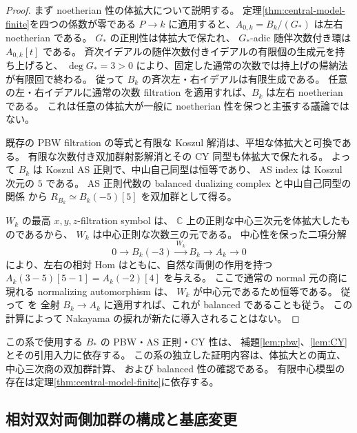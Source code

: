 \begin{proof}
まず noetherian 性の体拡大について説明する。
定理\ref{thm:central-model-finite}を四つの係数が零である
$P\to k$ に適用すると、$A_{0,k}=B_k/(G_*)$ は左右 noetherian である。
$G_*$ の正則性は体拡大で保たれ、
$G_*$-adic 随伴次数付き環は $A_{0,k}[t]$ である。
斉次イデアルの随伴次数付きイデアルの有限個の生成元を持ち上げると、
$\deg G_*=3>0$ により、固定した通常の次数では持上げの帰納法が有限回で終わる。
従って $B_k$ の斉次左・右イデアルは有限生成である。
任意の左・右イデアルに通常の次数 filtration を適用すれば、$B_k$ は左右 noetherian である。
これは任意の体拡大が一般に noetherian 性を保つと主張する議論ではない。

既存の PBW filtration の等式と有限な Koszul 解消は、平坦な体拡大と可換である。
有限な次数付き双加群射影解消とその CY 同型も体拡大で保たれる。
よって $B_k$ は Koszul AS 正則で、中山自己同型は恒等であり、
AS index は Koszul 次元の $5$ である。
AS 正則代数の balanced dualizing complex と中山自己同型の関係
\cite[Lemma~3.5 の証明、Theorem~6.3 の証明]{RRZHomological}
から $R_{B_k}\simeq B_k(-5)[5]$ を双加群として得る。

$W_k$ の最高 $x,y,z$-filtration symbol は、
$\mathbb C$ 上の正則な中心三次元を体拡大したものであるから、
$W_k$ は中心正則な次数三の元である。
中心性を保った二項分解
\[
 0\longrightarrow B_k(-3)
 \xrightarrow{\,W_k\,}B_k\longrightarrow A_k\longrightarrow0
\]
により、左右の相対 Hom はともに、自然な両側の作用を持つ
$A_k(3-5)[5-1]=A_k(-2)[4]$ を与える。
ここで通常の normal 元の商に現れる normalizing automorphism は、
$W_k$ が中心元であるため恒等である。
従って \cite[Proposition~5.2, Corollary~5.5]{YekutieliBalanced} を
全射 $B_k\to A_k$ に適用すれば、これが balanced であることも従う。
この計算によって Nakayama の捩れが新たに導入されることはない。
\end{proof}

\begin{remark}[入力の範囲]
この系で使用する $B_*$ の PBW・AS 正則・CY 性は、
補題\ref{lem:pbw}、\ref{lem:CY}とその引用入力に依存する。
この系の独立した証明内容は、体拡大との両立、中心三次商の双加群計算、
および balanced 性の確認である。
有限中心模型の存在は定理\ref{thm:central-model-finite}に依存する。
\end{remark}

\subsection{相対双対両側加群の構成と基底変更}

